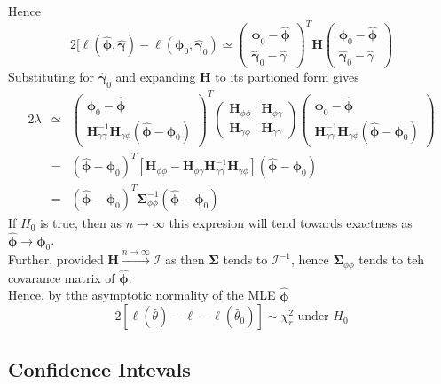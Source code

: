 \documentclass[11pt,a4paper]{article}
\begin{document}
Hence
$$2[\ell(\hat{\pmb\phi},\hat{\pmb\gamma})-\ell(\pmb\phi_0,\hat{\pmb\gamma}_0)\simeq\begin{pmatrix}\pmb\phi_0-\hat{\pmb\phi}\\\hat{\pmb\gamma}_0-\hat\gamma\end{pmatrix}^T\textbf{H}\begin{pmatrix}\pmb\phi_0-\hat{\pmb\phi}\\\hat{\pmb\gamma}_0-\hat\gamma\end{pmatrix}$$
Substituting for $\hat{\pmb\gamma}_0$ and expanding $\textbf{H}$ to its partioned form gives
\[\begin{array}{rcl}
2\lambda&\simeq&\begin{pmatrix}\pmb\phi_0-\hat{\pmb\phi}\\\textbf{H}^{-1}_{\gamma\gamma}\textbf{H}_{\gamma\phi}(\hat{\pmb\phi}-\pmb\phi_0)\end{pmatrix}^T\begin{pmatrix}\textbf{H}_{\phi\phi}&\textbf{H}_{\phi\gamma}\\\textbf{H}_{\gamma\phi}&\textbf{H}_{\gamma\gamma}\end{pmatrix}\begin{pmatrix}\pmb\phi_0-\hat{\pmb\phi}\\\textbf{H}^{-1}_{\gamma\gamma}\textbf{H}_{\gamma\phi}(\hat{\pmb\phi}-\pmb\phi_0)\end{pmatrix}\\
&=&(\hat{\pmb\phi}-\pmb\phi_0)^T[\textbf{H}_{\phi\phi}-\textbf{H}_{\phi\gamma}\textbf{H}^{-1}_{\gamma\gamma}\textbf{H}_{\gamma\phi}](\hat{\pmb\phi}-\pmb\phi_0)\\
&=&(\hat{\pmb\phi}-\pmb\phi_0)^T\pmb\Sigma_{\phi\phi}^{-1}(\hat{\pmb\phi}-\pmb\phi_0)
\end{array}\]
If $H_0$ is true, then as $n\to\infty$ this expresion will tend towards exactness as $\hat{\pmb\phi}\to\pmb\phi_0$.\\
Further, provided $\textbf{H}\overset{n\to\infty}{\longrightarrow}\pmb{\mathcal{I}}$ as then $\pmb\Sigma$ tends to $\pmb{\mathcal{I}}^{-1}$, hence $\pmb\Sigma_{\phi\phi}$ tends to teh covarance matrix of $\hat{\pmb\phi}$.\\
Hence, by tthe asymptotic normality of the MLE $\hat{\pmb\phi}$
$$2[\ell(\hat\theta)-\ell-\ell(\hat\theta_0)]\sim\chi^2_r\text{ under }H_0$$

\subsection{Confidence Intevals}
\end{document}
